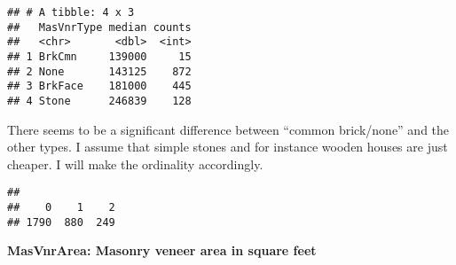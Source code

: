\documentclass[]{article}
\newenvironment{Shaded}{\begin{snugshade}}{\end{snugshade}}
\newcommand{\KeywordTok}[1]{\textcolor[rgb]{0.13,0.29,0.53}{\textbf{#1}}}
\newcommand{\DataTypeTok}[1]{\textcolor[rgb]{0.13,0.29,0.53}{#1}}
\newcommand{\DecValTok}[1]{\textcolor[rgb]{0.00,0.00,0.81}{#1}}
\newcommand{\StringTok}[1]{\textcolor[rgb]{0.31,0.60,0.02}{#1}}
\newcommand{\OperatorTok}[1]{\textcolor[rgb]{0.81,0.36,0.00}{\textbf{#1}}}
\newcommand{\NormalTok}[1]{#1}
\begin{document}
\begin{Shaded}
\end{Shaded}

\begin{verbatim}
## # A tibble: 4 x 3
##   MasVnrType median counts
##   <chr>       <dbl>  <int>
## 1 BrkCmn     139000     15
## 2 None       143125    872
## 3 BrkFace    181000    445
## 4 Stone      246839    128
\end{verbatim}

There seems to be a significant difference between ``common brick/none''
and the other types. I assume that simple stones and for instance wooden
houses are just cheaper. I will make the ordinality accordingly.

\begin{Shaded}
\end{Shaded}

\begin{verbatim}
## 
##    0    1    2 
## 1790  880  249
\end{verbatim}

\textbf{MasVnrArea: Masonry veneer area in square feet}
\end{document}
